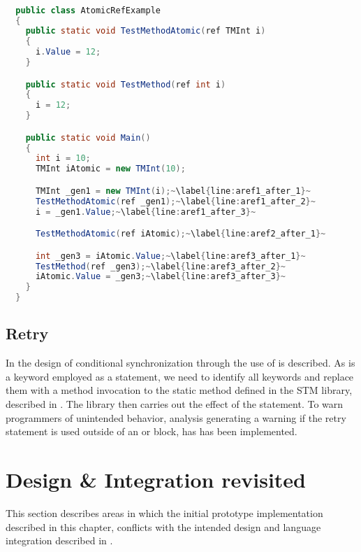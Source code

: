 \begin{lstlisting}[label=lst:after_atomic_ref,
  caption={\bscode{ref} Arguments After Transformation},
  language=Java,  
  showspaces=false,
  showtabs=false,
  breaklines=true,
  showstringspaces=false,
  breakatwhitespace=true,
  escapechar=~,
  commentstyle=\color{greencomments},
  keywordstyle=\color{bluekeywords},
  stringstyle=\color{redstrings},
  morekeywords={atomic, retry, orelse, var, get, set, ref, out}]  % Start your code-block

  public class AtomicRefExample
  {
    public static void TestMethodAtomic(ref TMInt i)
    {
      i.Value = 12;
    }

    public static void TestMethod(ref int i)
    {
      i = 12;
    }

    public static void Main()
    {
      int i = 10;
      TMInt iAtomic = new TMInt(10);

      TMInt _gen1 = new TMInt(i);~\label{line:aref1_after_1}~
      TestMethodAtomic(ref _gen1);~\label{line:aref1_after_2}~
      i = _gen1.Value;~\label{line:aref1_after_3}~

      TestMethodAtomic(ref iAtomic);~\label{line:aref2_after_1}~

      int _gen3 = iAtomic.Value;~\label{line:aref3_after_1}~
      TestMethod(ref _gen3);~\label{line:aref3_after_2}~
      iAtomic.Value = _gen3;~\label{line:aref3_after_3}~
    }
  }
\end{lstlisting}

\subsection{Retry}
In  the design of conditional synchronization through the use of  is described. As  is a keyword employed as a statement, we need to identify all  keywords and replace them with a method invocation to the static method  defined in the \ac{STM} library, described in . The library then carries out the effect of the  statement. To warn programmers of unintended behavior,  analysis generating a warning if the retry statement is used outside of an  or  block, has has been implemented. 

\section{Design \& Integration revisited}
This section describes areas in which the initial prototype implementation described in this chapter, conflicts with the intended design and language integration described in .

